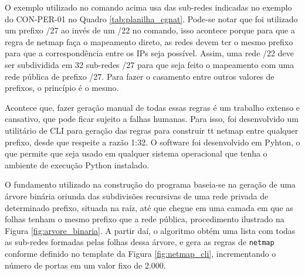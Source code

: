     O exemplo utilizado no comando acima usa das sub-redes indicadas no exemplo do CON-PER-01 no Quadro \ref{tab:planilha_cgnat}. Pode-se notar que foi utilizado um prefixo /27 ao invés de um /22 no comando, isso acontece porque para que a regra de netmap faça o mapeamento direto, as redes devem ter o mesmo prefixo para que a correspondência entre os IPs seja possível. Assim, uma rede /22 deve ser subdividida em 32 sub-redes /27 para que seja feito o mapeamento com uma rede pública de prefixo /27. Para fazer o casamento entre outros valores de prefixos, o princípio é o mesmo.
    
    Acontece que, fazer geração manual de todas essas regras é um trabalho extenso e cansativo, que pode ficar sujeito a falhas humanas. Para isso, foi desenvolvido um utilitário de CLI para geração das regras para construir {tt netmap} entre qualquer prefixo, desde que respeite a razão 1:32. O software foi desenvolvido em Pyhton, o que permite que seja usado em qualquer sistema operacional que tenha o ambiente de execução Python instalado.

    O fundamento utilizado na construção do programa baseia-se na geração de uma árvore binária oriunda das subdivisões recursivas de uma rede privada de determinado prefixo, situada na raíz, até que chegue em uma camada em que as folhas tenham o mesmo prefixo que a rede pública, procedimento ilustrado na Figura \ref{fig:arvore_binaria}. A partir daí, o algoritmo obtém uma lista com todas as sub-redes formadas pelas folhas dessa árvore, e gera as regras de {\tt netmap} conforme definido no template da Figura \ref{fig:netmap_cli}, incrementando o número de portas em um valor fixo de 2.000. 
    

